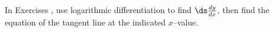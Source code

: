 {\noindent In Exercises}
{, use logarithmic differentiation to find $\ds \frac{dy}{dx}$, then find the equation of the tangent line at the indicated $x$--value.
}
